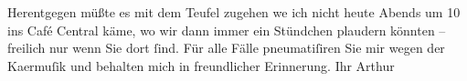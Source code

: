 \pstart
           Herentgegen müßte es mit dem Teufel zugehen {\pb}we{\geminationn} ich nicht heute Abends um 10 ins Café Central käme, wo wir dann immer ein Stündchen
               plaudern könnten – freilich nur wenn Sie dort ſind. Für alle Fälle pneumatiſiren Sie
               mir wegen der Ka{\geminationm}ermuſik und behalten mich in
               freundlicher Erinnerung.\pend
           \pstart Ihr \spacefill\mbox{Arthur}\pend{}\endnumbering{}  
      